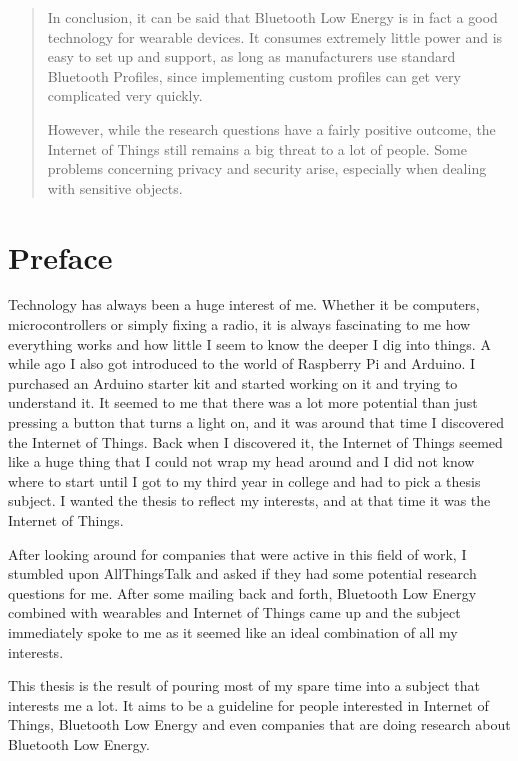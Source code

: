 \documentclass[pdftex,a4paper,12pt,twoside]{report}
\newcommand{\emptypage}{
\newpage
\thispagestyle{empty}
\mbox{}
\newpage
}
\begin{document}
\begin{abstract}
In conclusion, it can be said that Bluetooth Low Energy is in fact a good technology for wearable devices. It consumes extremely little power and is easy to set up and support, as long as manufacturers use standard Bluetooth Profiles, since implementing custom profiles can get very complicated very quickly.

However, while the research questions have a fairly positive outcome, the Internet of Things still remains a big threat to a lot of people. Some problems concerning privacy and security arise, especially when dealing with sensitive objects.
\end{abstract}

\emptypage

\chapter*{Preface}
\label{ch:preface}
Technology has always been a huge interest of me. Whether it be computers, microcontrollers or simply fixing a radio, it is always fascinating to me how everything works and how little I seem to know the deeper I dig into things. A while ago I also got introduced to the world of Raspberry Pi and Arduino. I purchased an Arduino starter kit and started working on it and trying to understand it. It seemed to me that there was a lot more potential than just pressing a button that turns a light on, and it was around that time I discovered the Internet of Things. Back when I discovered it, the Internet of Things seemed like a huge thing that I could not wrap my head around and I did not know where to start until I got to my third year in college and had to pick a thesis subject. I wanted the thesis to reflect my interests, and at that time it was the Internet of Things.

After looking around for companies that were active in this field of work, I stumbled upon AllThingsTalk and asked if they had some potential research questions for me. After some mailing back and forth, Bluetooth Low Energy combined with wearables and Internet of Things came up and the subject immediately spoke to me as it seemed like an ideal combination of all my interests.

This thesis is the result of pouring most of my spare time into a subject that interests me a lot. It aims to be a guideline for people interested in Internet of Things, Bluetooth Low Energy and even companies that are doing research about Bluetooth Low Energy.

\end{document}
